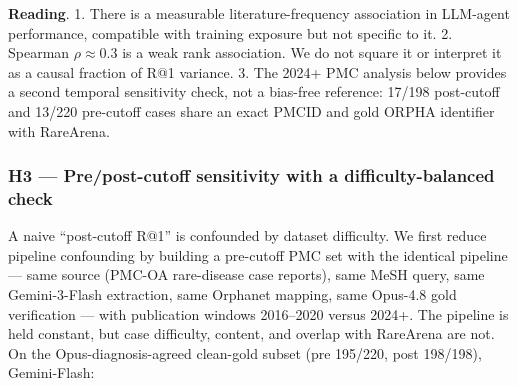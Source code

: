 \textbf{Reading}.
1. There is a measurable literature-frequency association in LLM-agent
performance, compatible with training exposure but not specific to it.
2. Spearman \ensuremath{\rho}\ensuremath{\approx}0.3 is a weak rank association. We do not square it or interpret
it as a causal fraction of R@1 variance.
3. The 2024+ PMC analysis below provides a second temporal sensitivity check,
not a bias-free reference: 17/198 post-cutoff and 13/220 pre-cutoff cases
share an exact PMCID and gold ORPHA identifier with RareArena.

\subsubsection{H3 --- Pre/post-cutoff sensitivity with a difficulty-balanced check}\label{sec-7-10-1}

A naive ``post-cutoff R@1'' is confounded by dataset difficulty. We first reduce
pipeline confounding by building a pre-cutoff PMC set with the identical pipeline ---
same source (PMC-OA rare-disease case reports), same MeSH query, same
Gemini-3-Flash extraction, same Orphanet mapping, same Opus-4.8 gold
verification --- with publication windows 2016--2020 versus 2024+. The
pipeline is held constant, but case difficulty, content, and overlap with
RareArena are not.
On the
Opus-diagnosis-agreed clean-gold subset (pre 195/220, post 198/198), Gemini-Flash:

